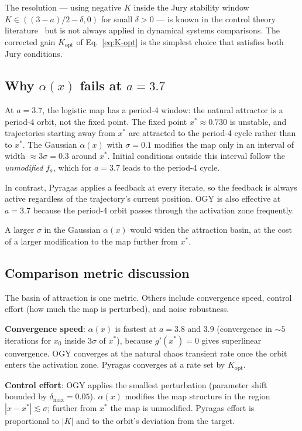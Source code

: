 \documentclass[aps,pre,twocolumn,superscriptaddress,nofootinbib,
               longbibliography,floatfix]{revtex4-2}
\newcommand{\xstar}{x^*}
\begin{document}
The resolution — using negative $K$ inside the Jury stability
window $K \in ((3-a)/2 - \delta, 0)$ for small $\delta > 0$
— is known in the control theory literature~\cite{JustEtAl1997}
but is not always applied in dynamical systems comparisons.
The corrected gain $K_{\mathrm{opt}}$ of Eq.~\eqref{eq:K-opt}
is the simplest choice that satisfies both Jury conditions.

\subsection{Why $\alpha(x)$ fails at $a = 3.7$}

At $a = 3.7$, the logistic map has a period-4 window:
the natural attractor is a period-4 orbit, not the fixed point.
The fixed point $\xstar \approx 0.730$ is unstable, and
trajectories starting away from $\xstar$ are attracted to
the period-4 cycle rather than to $\xstar$.
The Gaussian $\alpha(x)$ with $\sigma = 0.1$ modifies the
map only in an interval of width $\approx 3\sigma = 0.3$
around $\xstar$.
Initial conditions outside this interval follow the
\emph{unmodified} $f_a$, which for $a = 3.7$ leads to the
period-4 cycle.

In contrast, Pyragas applies a feedback at every iterate,
so the feedback is always active regardless of the
trajectory's current position.
OGY is also effective at $a = 3.7$ because the period-4
orbit passes through the activation zone frequently.

A larger $\sigma$ in the Gaussian $\alpha(x)$ would widen
the attraction basin, at the cost of a larger modification
to the map further from $\xstar$.

\subsection{Comparison metric discussion}

The basin of attraction is one metric.
Others include convergence speed, control effort (how much
the map is perturbed), and noise robustness.

\textbf{Convergence speed}: $\alpha(x)$ is fastest at
$a = 3.8$ and $3.9$ (convergence in $\sim 5$ iterations
for $x_0$ inside $3\sigma$ of $\xstar$), because
$g'(\xstar) = 0$ gives superlinear convergence.
OGY converges at the natural chaos transient rate once the
orbit enters the activation zone.
Pyragas converges at a rate set by $K_{\mathrm{opt}}$.

\textbf{Control effort}: OGY applies the smallest perturbation
(parameter shift bounded by $\delta_{\max} = 0.05$).
$\alpha(x)$ modifies the map structure in the region
$|x - \xstar| \lesssim \sigma$; further from $\xstar$ the
map is unmodified.
Pyragas effort is proportional to $|K|$ and to the orbit's
deviation from the target.
\end{document}
